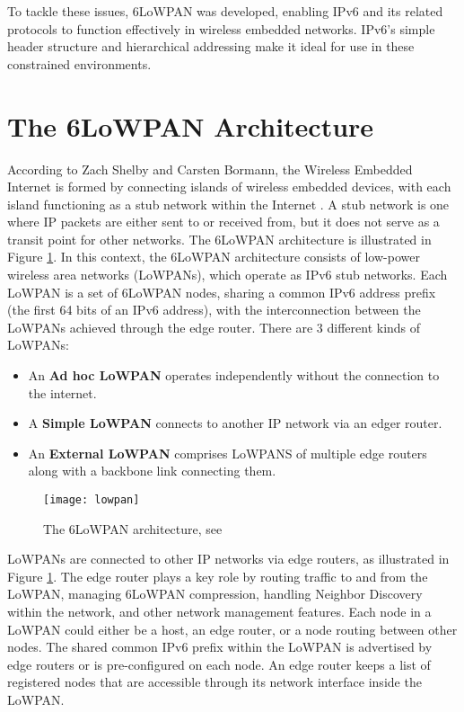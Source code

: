  To tackle these issues, 6LoWPAN \cite{rfc4944} was developed, enabling IPv6 and its related protocols 
 to function effectively in wireless embedded networks. IPv6’s simple header structure 
 and hierarchical addressing make it ideal for use in these constrained environments.

\section{The 6LoWPAN Architecture}
  According to Zach Shelby and Carsten Bormann, the Wireless Embedded Internet 
  is formed by connecting islands of wireless embedded devices, 
  with each island functioning as a stub network within the Internet \cite[p.~13]{wie}. 
  A stub network is one where IP packets are either sent to or received from, 
  but it does not serve as a transit point for other networks. The 6LoWPAN architecture is
  illustrated in Figure \ref{fig:lowpan}. In this context, the 6LoWPAN architecture consists of low-power wireless area networks (LoWPANs), 
  which operate as IPv6 stub networks. Each LoWPAN is a set of 6LoWPAN nodes, sharing a common
  IPv6 address prefix (the first 64 bits of an IPv6 address), with the interconnection between the
  LoWPANs achieved through the edge router. There are 3 different kinds of LoWPANs:
  \begin{itemize}
    \item An \textbf{Ad hoc LoWPAN} operates independently without the connection to the internet.
    \item A \textbf{Simple LoWPAN} connects to another IP network via an edger router.
    \item An \textbf{External LoWPAN} comprises LoWPANS of multiple edge routers along
    with a backbone link connecting them.
  \end{itemize}

  \begin{figure}[h]
    \centering
    \texttt{[image: lowpan]}
    \caption{The 6LoWPAN architecture, see \cite[p.~14]{wie}}
    \label{fig:lowpan}
  \end{figure}

  LoWPANs are connected to other IP networks via edge routers, as illustrated in Figure 
  \ref{fig:lowpan}. The edge router plays a key role by routing traffic to and from the LoWPAN, 
  managing 6LoWPAN  compression, handling Neighbor Discovery within the network, and other network
  management features. Each node in a LoWPAN could either be a host, an edge router, or a node routing
  between other nodes. The shared common IPv6 prefix within the LoWPAN is advertised by edge routers
  or is pre-configured on each node. An edge router keeps a list of registered nodes that are accessible 
  through its network interface inside the LoWPAN.

